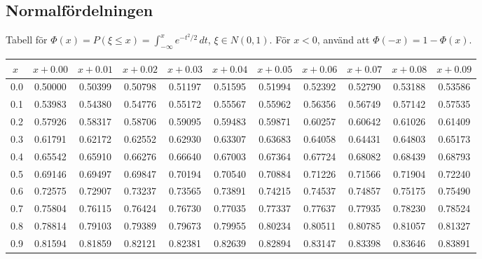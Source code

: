\documentclass{article}
\begin{document}
{\vspace{8pt minus 6pt}
\subsection*{Normalfördelningen}

Tabell för $\Phi(x)=P(\xi\le x)=\int_{-\infty}^x e^{-t^2/2}\,dt$,  $\xi\in N(0,1)$. För $x<0$, använd att $\Phi(-x)=1-\Phi(x)$.

\def\myskip{\vspace{8pt minus 6pt}}
\medskip\begin{tabular}{|c|c|c|c|c|c|c|c|c|c|c|}
\hline
$x\;$&$x\!+\!0.00$&$x\!+\!0.01$&$x\!+\!0.02$&$x\!+\!0.03$&$x\!+\!0.04$&$x\!+\!0.05$&$x\!+\!0.06$&$x\!+\!0.07$&$x\!+\!0.08$&$x\!+\!0.09$\\\hline
0.0&0.50000&0.50399&0.50798&0.51197&0.51595&0.51994&0.52392&0.52790&0.53188&0.53586\\
0.1&0.53983&0.54380&0.54776&0.55172&0.55567&0.55962&0.56356&0.56749&0.57142&0.57535\\
0.2&0.57926&0.58317&0.58706&0.59095&0.59483&0.59871&0.60257&0.60642&0.61026&0.61409\\
0.3&0.61791&0.62172&0.62552&0.62930&0.63307&0.63683&0.64058&0.64431&0.64803&0.65173\\
0.4&0.65542&0.65910&0.66276&0.66640&0.67003&0.67364&0.67724&0.68082&0.68439&0.68793\\
0.5&0.69146&0.69497&0.69847&0.70194&0.70540&0.70884&0.71226&0.71566&0.71904&0.72240\\
0.6&0.72575&0.72907&0.73237&0.73565&0.73891&0.74215&0.74537&0.74857&0.75175&0.75490\\
0.7&0.75804&0.76115&0.76424&0.76730&0.77035&0.77337&0.77637&0.77935&0.78230&0.78524\\
0.8&0.78814&0.79103&0.79389&0.79673&0.79955&0.80234&0.80511&0.80785&0.81057&0.81327\\
0.9&0.81594&0.81859&0.82121&0.82381&0.82639&0.82894&0.83147&0.83398&0.83646&0.83891\\
\hline
\end{tabular}

}
\end{document}
